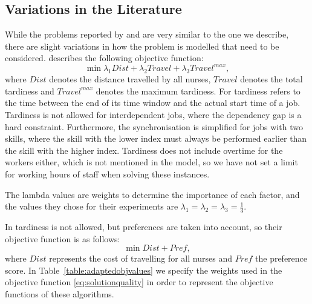 \documentclass[a4paper,11pt,authoryear]{elsarticle}
\begin{document}
\subsection{Variations in the Literature}
\label{sub:literaturedata}
\noindent While the problems reported by \cite{mankowska2014} and \cite{aithaddadene2016} are very similar to the one we describe, there are slight variations in how the problem is modelled that need to be considered. \cite{mankowska2014} describes the following objective function:
\begin{equation}
    \min \lambda_1 Dist + \lambda_2 Travel + \lambda_3 Travel^{max}, \label{eq:mankowskaobj}
\end{equation}
where $Dist$ denotes the distance travelled by all nurses, $Travel$ denotes the total tardiness and $Travel^{max}$ denotes the maximum tardiness. For \cite{mankowska2014} tardiness refers to the time between the end of its time window and the actual start time of a job. Tardiness is not allowed for interdependent jobs, where the dependency gap is a hard constraint. Furthermore, the synchronisation is simplified for jobs with two skills, where the skill with the lower index must always be performed earlier than the skill with the higher index.
Tardiness does not include overtime for the workers either, which is not mentioned in the model, so we have not set a limit for working hours of staff when solving these instances.

The lambda values are weights to determine the importance of each factor, and the values they chose for their experiments are $\lambda_1 = \lambda_2 = \lambda_3 = \frac{1}{3}$.

In \cite{aithaddadene2016} tardiness is not allowed, but preferences are taken into account, so their objective function is as follows:
\begin{equation}
    \min Dist + Pref, \label{eq:aithobj}
\end{equation}
where $Dist$ represents the cost of travelling for all nurses and $Pref$ the preference score.
In Table~\ref{table:adaptedobjvalues} we specify the weights used in the objective function \eqref{eq:solutionquality} in order to represent the objective functions of these algorithms.
\end{document}
